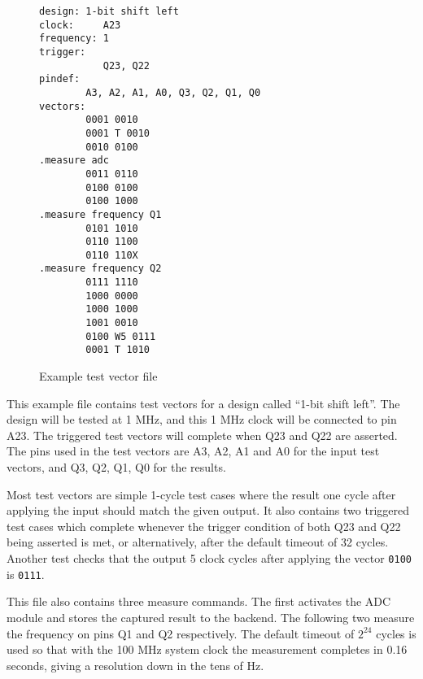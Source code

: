 \begin{figure}[h!]
\lstset{basicstyle=\scriptsize\ttfamily}
\begin{lstlisting}
design: 1-bit shift left
clock:     A23
frequency: 1
trigger:
           Q23, Q22
pindef:
        A3, A2, A1, A0, Q3, Q2, Q1, Q0
vectors:
        0001 0010
        0001 T 0010
        0010 0100
.measure adc
        0011 0110
        0100 0100
        0100 1000
.measure frequency Q1
        0101 1010
        0110 1100
        0110 110X
.measure frequency Q2
        0111 1110
        1000 0000
        1000 1000
        1001 0010
        0100 W5 0111
        0001 T 1010
\end{lstlisting}
\caption{Example test vector file}
\label{listing:testvec_example}
\end{figure}

This example file contains test vectors
for a design called ``1-bit shift left''. The design will be tested at 1 MHz, and
this 1 MHz clock will be connected to pin A23. The triggered test vectors
will complete when Q23 and Q22 are asserted. The pins used in the test vectors are
A3, A2, A1 and A0 for the input test vectors, and Q3, Q2, Q1, Q0 for the results.

Most test vectors are simple 1-cycle test cases where the result one cycle after applying
the input should match the given output. It also contains two triggered test cases
which complete whenever the trigger condition of both Q23 and Q22 being asserted is met, or
alternatively, after the default timeout of 32 cycles. Another test checks that the
output 5 clock cycles after applying the vector \texttt{0100} is \texttt{0111}.

This file also contains three measure commands. The first activates the ADC module and
stores the captured result to the backend. The following two measure the frequency on
pins Q1 and Q2 respectively. The default timeout of $2^{24}$ cycles is used so that with
the 100 MHz system clock the measurement completes in 0.16 seconds, giving a resolution
down in the tens of Hz.


